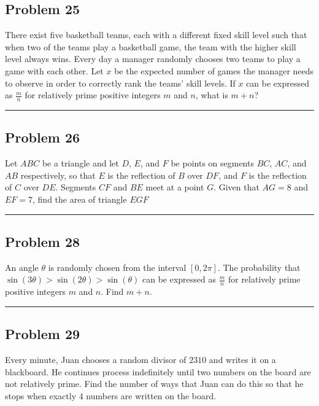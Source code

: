 \documentclass[10pt]{scrartcl}\usepackage[utf8]{inputenc}\usepackage{amsmath}\usepackage{amsfonts} \usepackage{tikz}\usepackage{asymptote}\usepackage[most]{tcolorbox}\usepackage{fancyhdr}\usepackage{geometry}\usepackage{color}\usepackage{lewis}\usepackage[T1]{fontenc}\usepackage[explicit]{titlesec}\usepackage{fontawesome}\usepackage{sansmathfonts}\pagestyle{fancy}
\begin{document}
\subsection*{Problem 25}

There exist five basketball teams, each with a different fixed skill level such that when two of the teams play a basketball game, the team with the higher skill level always wins. Every day a manager randomly chooses two teams to play a game with each other. Let $x$ be the expected number of games the manager needs to observe in order to correctly rank the teams' skill levels. If $x$ can be expressed as $\frac{m}{n}$ for relatively prime positive integers $m$ and $n$, what is $m+n$?
\\
\noindent\rule{14.5cm}{0.8pt}
\subsection*{Problem 26}
Let $ABC$ be a triangle and let $D$, $E$, and $F$ be points on segments $BC$, $AC$, and $AB$ respectively, so that $E$ is the reflection of $B$ over $DF$, and $F$ is the reflection of $C$ over $DE$. Segments $CF$ and $BE$ meet at a point $G$. Given that $AG = 8$ and $EF = 7$, find the area of triangle $EGF$
\\
\noindent\rule{14.5cm}{0.8pt}
\subsection*{Problem 28}
An angle $\theta$ is randomly chosen from the interval $[0, 2\pi]$. The probability that $\sin(3\theta)>\sin(2\theta)>\sin(\theta)$ can be expressed as $\frac{m}{n}$ for relatively prime positive integers $m$ and $n$. Find $m+n$.

\noindent\rule{14.5cm}{0.8pt}
\subsection*{Problem 29}
Every minute, Juan chooses a random divisor of $2310$ and writes it on a blackboard. He continues process indefinitely until two numbers on the board are not relatively prime. Find the number of ways that Juan can do this so that he stops when exactly $4$ numbers are written on the board.
\\
\end{document}

